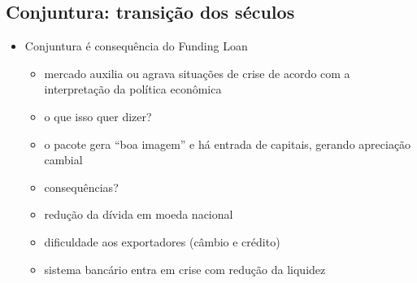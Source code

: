 \documentclass[a4paper,12pt]{article}[abntex2]
\begin{document}
\subsection{\textbf{Conjuntura: transição dos séculos}}
\begin{itemize}
    \item Conjuntura é consequência do Funding Loan
    \begin{itemize}
        \item mercado auxilia ou agrava situações de crise de acordo com a interpretação da política econômica
    \end{itemize}
    \begin{itemize}
        \begin{itemize}
            \item  o que isso quer dizer?
        \end{itemize}
    \end{itemize}
    \begin{itemize}
        \item o pacote gera “boa imagem” e há entrada de capitais, gerando apreciação cambial
    \end{itemize}

\begin{itemize}
    \begin{itemize}
        \item consequências?
    \end{itemize}
\end{itemize}
\begin{itemize}
    \item  redução da dívida em moeda nacional
\end{itemize}
\begin{itemize}
    \item  dificuldade aos exportadores (câmbio e crédito)
\end{itemize}
\begin{itemize}
    \item sistema bancário entra em crise com redução da liquidez
\end{itemize} 
\end{itemize}
\end{document}
